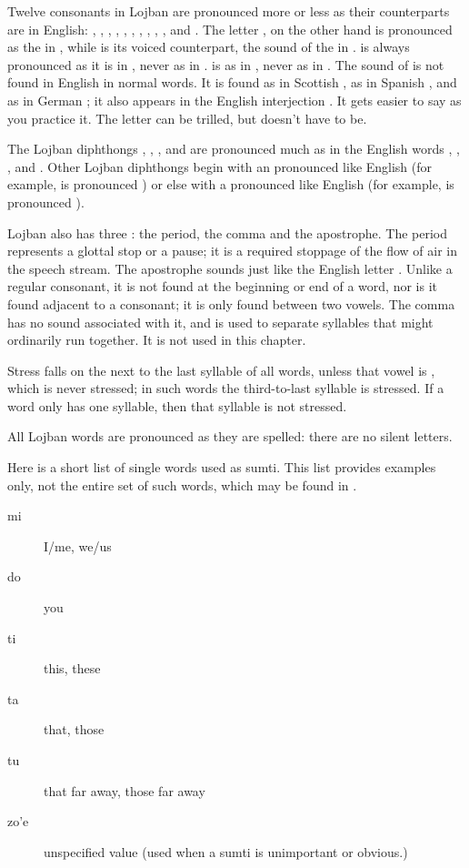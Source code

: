 Twelve consonants in Lojban are pronounced more or less as their counterparts are in English: , , , , , , , , , ,  and . The letter , on the other hand is pronounced as the  in , while  is its voiced counterpart, the sound of the  in .  is always pronounced as it is in , never as in .  is as in , never as in . The sound of  is not found in English in normal words. It is found as  in Scottish , as  in Spanish , and as  in German ; it also appears in the English interjection . It gets easier to say as you practice it. The letter  can be trilled, but doesn't have to be.

The Lojban diphthongs , , , and  are pronounced much as in the English words , , , and . Other Lojban diphthongs begin with an  pronounced like English  (for example,  is pronounced ) or else with a  pronounced like English  (for example,  is pronounced ).

Lojban also has three : the period, the comma and the apostrophe. The period represents a glottal stop or a pause; it is a required stoppage of the flow of air in the speech stream. The apostrophe sounds just like the English letter . Unlike a regular consonant, it is not found at the beginning or end of a word, nor is it found adjacent to a consonant; it is only found between two vowels. The comma has no sound associated with it, and is used to separate syllables that might ordinarily run together. It is not used in this chapter.

Stress falls on the next to the last syllable of all words, unless that vowel is , which is never stressed; in such words the third-to-last syllable is stressed. If a word only has one syllable, then that syllable is not stressed.

All Lojban words are pronounced as they are spelled: there are no silent letters.



Here is a short list of single words used as sumti. This list provides examples only, not the entire set of such words, which may be found in .
\begin{description}
\item[mi] I/me, we/us
\item[do] you
\item[ti] this, these
\item[ta] that, those
\item[tu] that far away, those far away
\item[zo'e] unspecified value (used when a sumti is unimportant or obvious.)
\end{description}

